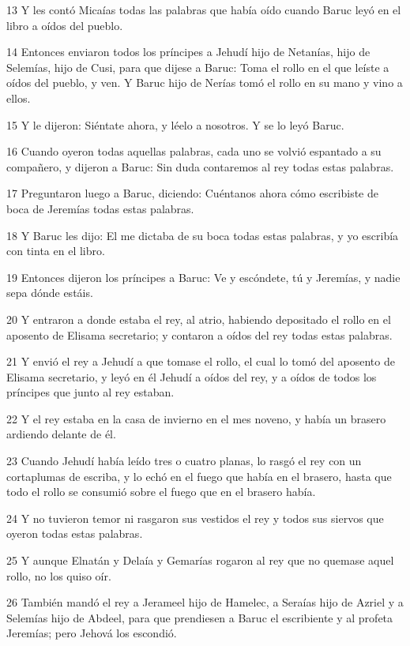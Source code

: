 \par 13 Y les contó Micaías todas las palabras que había oído cuando Baruc leyó en el libro a oídos del pueblo.
\par 14 Entonces enviaron todos los príncipes a Jehudí hijo de Netanías, hijo de Selemías, hijo de Cusi, para que dijese a Baruc: Toma el rollo en el que leíste a oídos del pueblo, y ven. Y Baruc hijo de Nerías tomó el rollo en su mano y vino a ellos.
\par 15 Y le dijeron: Siéntate ahora, y léelo a nosotros. Y se lo leyó Baruc.
\par 16 Cuando oyeron todas aquellas palabras, cada uno se volvió espantado a su compañero, y dijeron a Baruc: Sin duda contaremos al rey todas estas palabras.
\par 17 Preguntaron luego a Baruc, diciendo: Cuéntanos ahora cómo escribiste de boca de Jeremías todas estas palabras.
\par 18 Y Baruc les dijo: El me dictaba de su boca todas estas palabras, y yo escribía con tinta en el libro.
\par 19 Entonces dijeron los príncipes a Baruc: Ve y escóndete, tú y Jeremías, y nadie sepa dónde estáis.
\par 20 Y entraron a donde estaba el rey, al atrio, habiendo depositado el rollo en el aposento de Elisama secretario; y contaron a oídos del rey todas estas palabras.
\par 21 Y envió el rey a Jehudí a que tomase el rollo, el cual lo tomó del aposento de Elisama secretario, y leyó en él Jehudí a oídos del rey, y a oídos de todos los príncipes que junto al rey estaban.
\par 22 Y el rey estaba en la casa de invierno en el mes noveno, y había un brasero ardiendo delante de él.
\par 23 Cuando Jehudí había leído tres o cuatro planas, lo rasgó el rey con un cortaplumas de escriba, y lo echó en el fuego que había en el brasero, hasta que todo el rollo se consumió sobre el fuego que en el brasero había.
\par 24 Y no tuvieron temor ni rasgaron sus vestidos el rey y todos sus siervos que oyeron todas estas palabras.
\par 25 Y aunque Elnatán y Delaía y Gemarías rogaron al rey que no quemase aquel rollo, no los quiso oír.
\par 26 También mandó el rey a Jerameel hijo de Hamelec, a Seraías hijo de Azriel y a Selemías hijo de Abdeel, para que prendiesen a Baruc el escribiente y al profeta Jeremías; pero Jehová los escondió.
